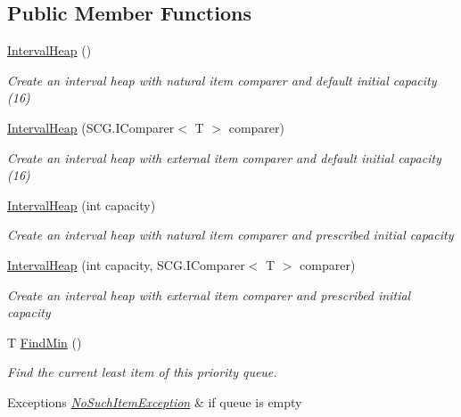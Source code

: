 \subsection*{Public Member Functions}
\begin{DoxyCompactItemize}
\item 
\hyperlink{class_c5_1_1_interval_heap_a5a6140a981bbc3f40b101a26dee6c37f}{Interval\+Heap} ()
\begin{DoxyCompactList}\small\item\em Create an interval heap with natural item comparer and default initial capacity (16) \end{DoxyCompactList}\item 
\hyperlink{class_c5_1_1_interval_heap_a94962594feb3b88e0cd87ad2397df4ed}{Interval\+Heap} (S\+C\+G.\+I\+Comparer$<$ T $>$ comparer)
\begin{DoxyCompactList}\small\item\em Create an interval heap with external item comparer and default initial capacity (16) \end{DoxyCompactList}\item 
\hyperlink{class_c5_1_1_interval_heap_ae7bdfcb5955687d26fc5a380c89256eb}{Interval\+Heap} (int capacity)
\begin{DoxyCompactList}\small\item\em Create an interval heap with natural item comparer and prescribed initial capacity \end{DoxyCompactList}\item 
\hyperlink{class_c5_1_1_interval_heap_a4259a4d0b543370844e066dd9a165c49}{Interval\+Heap} (int capacity, S\+C\+G.\+I\+Comparer$<$ T $>$ comparer)
\begin{DoxyCompactList}\small\item\em Create an interval heap with external item comparer and prescribed initial capacity \end{DoxyCompactList}\item 
T \hyperlink{class_c5_1_1_interval_heap_ad4671adf7daad4e8b6711c0a9a5663fe}{Find\+Min} ()
\begin{DoxyCompactList}\small\item\em Find the current least item of this priority queue. 
\begin{DoxyExceptions}{Exceptions}
{\em \hyperlink{class_c5_1_1_no_such_item_exception}{No\+Such\+Item\+Exception}} & if queue is empty \\
\hline
\end{DoxyExceptions}
\end{DoxyCompactList}\item 

\end{DoxyCompactItemize}
